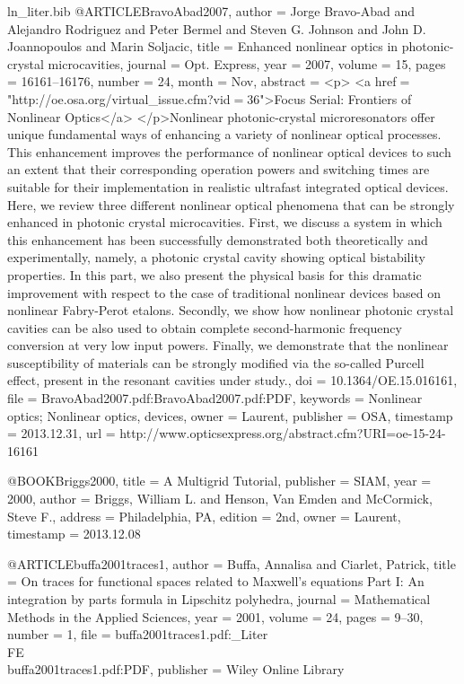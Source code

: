 \begin{filecontents*}{ln_liter.bib}
@ARTICLE{BravoAbad2007,
  author = {Jorge Bravo-Abad and Alejandro Rodriguez and Peter Bermel and Steven
	G. Johnson and John D. Joannopoulos and Marin Soljacic},
  title = {Enhanced nonlinear optics in photonic-crystal microcavities},
  journal = {Opt. Express},
  year = {2007},
  volume = {15},
  pages = {16161--16176},
  number = {24},
  month = {Nov},
  abstract = {{\textless}p{\textgreater} {\textless}a href$=$"http://oe.osa.org/virtual_issue.cfm?vid$=$36"{\textgreater}Focus
	Serial: Frontiers of Nonlinear Optics{\textless}/a{\textgreater}
	{\textless}/p{\textgreater}Nonlinear photonic-crystal microresonators
	offer unique fundamental ways of enhancing a variety of nonlinear
	optical processes. This enhancement improves the performance of nonlinear
	optical devices to such an extent that their corresponding operation
	powers and switching times are suitable for their implementation
	in realistic ultrafast integrated optical devices. Here, we review
	three different nonlinear optical phenomena that can be strongly
	enhanced in photonic crystal microcavities. First, we discuss a system
	in which this enhancement has been successfully demonstrated both
	theoretically and experimentally, namely, a photonic crystal cavity
	showing optical bistability properties. In this part, we also present
	the physical basis for this dramatic improvement with respect to
	the case of traditional nonlinear devices based on nonlinear Fabry-Perot
	etalons. Secondly, we show how nonlinear photonic crystal cavities
	can be also used to obtain complete second-harmonic frequency conversion
	at very low input powers. Finally, we demonstrate that the nonlinear
	susceptibility of materials can be strongly modified via the so-called
	Purcell effect, present in the resonant cavities under study.},
  doi = {10.1364/OE.15.016161},
  file = {BravoAbad2007.pdf:BravoAbad2007.pdf:PDF},
  keywords = {Nonlinear optics; Nonlinear optics, devices},
  owner = {Laurent},
  publisher = {OSA},
  timestamp = {2013.12.31},
  url = {http://www.opticsexpress.org/abstract.cfm?URI=oe-15-24-16161}
}

@BOOK{Briggs2000,
  title = {A Multigrid Tutorial},
  publisher = {SIAM},
  year = {2000},
  author = {Briggs, William L. and Henson, Van Emden and McCormick, Steve F.},
  address = {Philadelphia, PA},
  edition = {2nd},
  owner = {Laurent},
  timestamp = {2013.12.08}
}

@ARTICLE{buffa2001traces1,
  author = {Buffa, Annalisa and Ciarlet, Patrick},
  title = {On traces for functional spaces related to {M}axwell's equations Part
	I: An integration by parts formula in Lipschitz polyhedra},
  journal = {Mathematical Methods in the Applied Sciences},
  year = {2001},
  volume = {24},
  pages = {9--30},
  number = {1},
  file = {buffa2001traces1.pdf:_Liter\\FE\\buffa2001traces1.pdf:PDF},
  publisher = {Wiley Online Library}
}


\end{filecontents*}
